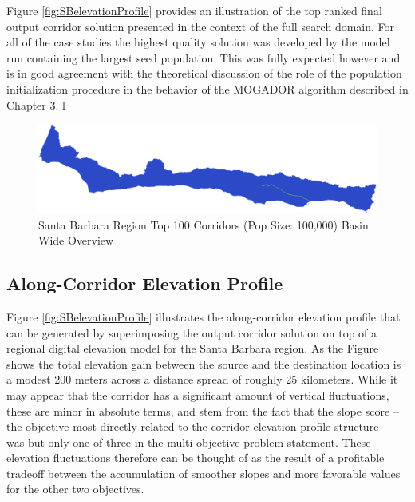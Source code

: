 Figure \ref{fig:SBelevationProfile} provides an illustration of the top ranked final output corridor solution presented in the context of the full search domain. For all of the case studies the highest quality solution was developed by the model run containing the largest seed population. This was fully expected however and is in good agreement with the theoretical discussion of the role of the population initialization procedure in the behavior of the MOGADOR algorithm described in Chapter 3. l

        \begin{figure}[!h]
            \begin{center}
            \includegraphics[width=5.5in]{figures/SantaBarbara_PathwayLarge.png}   
            \caption{Santa Barbara Region Top 100 Corridors (Pop Size: 100,000) Basin Wide Overview}
            \label{fig:SBsolutionOverview}
            \end{center}
        \end{figure}
        
    \subsection{Along-Corridor Elevation Profile}
    
Figure \ref{fig:SBelevationProfile} illustrates the along-corridor elevation profile that can be generated by superimposing the output corridor solution on top of a regional digital elevation model for the Santa Barbara region. As the Figure shows the total elevation gain between the source and the destination location is a modest 200 meters across a distance spread of roughly 25 kilometers. While it may appear that the corridor has a significant amount of vertical fluctuations, these are minor in absolute terms, and stem from the fact that the slope score -- the objective most directly related to the corridor elevation profile structure -- was but only one of three in the multi-objective problem statement. These elevation fluctuations therefore can be thought of as the result of a profitable tradeoff between the accumulation of smoother slopes and more favorable values for the other two objectives. 
        
